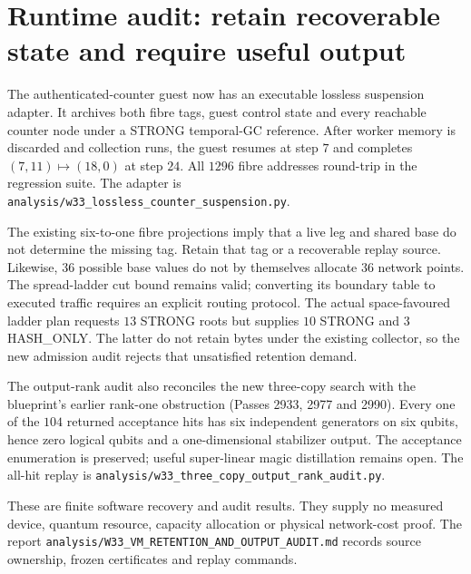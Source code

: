 \section*{Runtime audit: retain recoverable state and require useful output}
The authenticated-counter guest now has an executable lossless suspension
adapter. It archives both fibre tags, guest control state and every reachable
counter node under a STRONG temporal-GC reference. After worker memory is
discarded and collection runs, the guest resumes at step $7$ and completes
$(7,11)\mapsto(18,0)$ at step $24$. All $1296$ fibre addresses round-trip in
the regression suite. The adapter is
\texttt{analysis/w33\_lossless\_counter\_suspension.py}.

The existing six-to-one fibre projections imply that a live leg and shared
base do not determine the missing tag. Retain that tag or a recoverable replay
source. Likewise, $36$ possible base values do not by themselves allocate
$36$ network points. The spread-ladder cut bound remains valid; converting
its boundary table to executed traffic requires an explicit routing protocol.
The actual space-favoured ladder plan requests $13$ STRONG roots but supplies
$10$ STRONG and $3$ HASH\_ONLY. The latter do not retain bytes under the existing
collector, so the new admission audit rejects that unsatisfied retention demand.

The output-rank audit also reconciles the new three-copy search with the
blueprint's earlier rank-one obstruction (Passes 2933, 2977 and 2990).
Every one of the $104$ returned acceptance hits has six independent generators
on six qubits, hence zero logical qubits and a one-dimensional stabilizer
output. The acceptance enumeration is preserved; useful super-linear magic
distillation remains open. The all-hit replay is
\texttt{analysis/w33\_three\_copy\_output\_rank\_audit.py}.

These are finite software recovery and audit results. They supply no measured
device, quantum resource, capacity allocation or physical network-cost proof.
The report \texttt{analysis/W33\_VM\_RETENTION\_AND\_OUTPUT\_AUDIT.md}
records source ownership, frozen certificates and replay commands.
